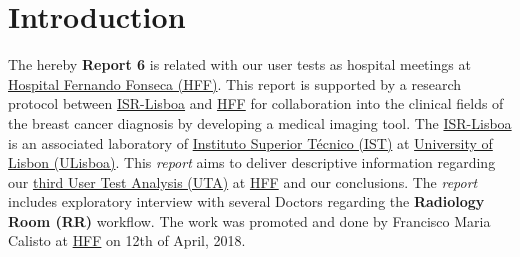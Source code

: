 
\section*{Introduction}

The hereby \textbf{Report 6} is related with our user tests as hospital meetings at \hyperlink{http://hff.min-saude.pt/}{Hospital Fernando Fonseca (HFF)}. This report is supported by a research protocol between \hyperlink{http://welcome.isr.tecnico.ulisboa.pt/}{ISR-Lisboa} and \hyperlink{http://hff.min-saude.pt/}{HFF} for collaboration into the clinical fields of the breast cancer diagnosis by developing a medical imaging tool. The \hyperlink{http://welcome.isr.tecnico.ulisboa.pt/}{ISR-Lisboa} is an associated laboratory of \hyperlink{http://tecnico.ulisboa.pt/}{Instituto Superior T\'{e}cnico (IST)} at \hyperlink{https://www.ulisboa.pt/}{University of Lisbon (ULisboa)}. This \textit{report} aims to deliver descriptive information regarding our \hyperlink{https://ulisboa-my.sharepoint.com/:f:/g/personal/francisco_calisto_office365_ulisboa_pt/EvTuVe-jyClHgNYUvCXJ1YYBUIYAKlFdjOwCDU1X5F71Kw?e=9IC0Dy}{third User Test Analysis (UTA)} at \hyperlink{http://hff.min-saude.pt/}{HFF} and our conclusions. The \textit{report} includes exploratory interview with several Doctors regarding the \textbf{Radiology Room (RR)} workflow. The work was promoted and done by Francisco Maria Calisto at \hyperlink{http://hff.min-saude.pt/}{HFF} on 12th of April, 2018.